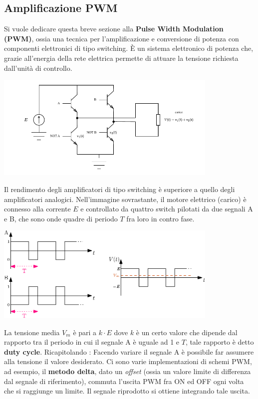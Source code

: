 \documentclass[10pt, letterpaper]{report}
\begin{document}
\subsection{Amplificazione PWM}
Si vuole dedicare questa breve sezione alla \textbf{Pulse Width Modulation (PWM)}, ossia una tecnica per l'amplificazione e conversione di potenza con componenti elettronici di tipo switching. È un sistema elettronico di potenza che, grazie all'energia della rete elettrica permette di attuare la tensione richiesta dall'unità di controllo.\begin{center}
    \includegraphics[width=0.8\textwidth ]{images/PWM.pdf}
\end{center}
Il rendimento degli amplificatori di tipo switching è superiore a quello degli amplificatori analogici. Nell'immagine sovrastante, il motore elettrico (carico) è connesso alla corrente $E$ e controllato da quattro switch pilotati da due segnali A e B, che sono onde quadre di periodo $T$ 
fra loro in contro fase. \begin{center}
    \includegraphics[width=0.8\textwidth ]{images/pwmOndeQuadre.eps}
\end{center}
La tensione media $V_m$ è pari a $k\cdot E$ dove $k$ è un certo valore che dipende dal rapporto 
tra il periodo in cui il segnale A è uguale ad 1 e $T$, tale rapporto è detto \textbf{duty cycle}.
Ricapitolando : Facendo variare il segnale A è possibile far assumere alla tensione il valore desiderato. Ci sono varie implementazioni di schemi PWM, ad esempio, il \textbf{metodo delta}, dato un \textit{offset} (ossia un valore limite di differenza dal segnale di riferimento), commuta l'uscita PWM fra ON ed OFF ogni volta che si raggiunge un limite. Il segnale riprodotto si ottiene integrando tale uscita.
\end{document}
